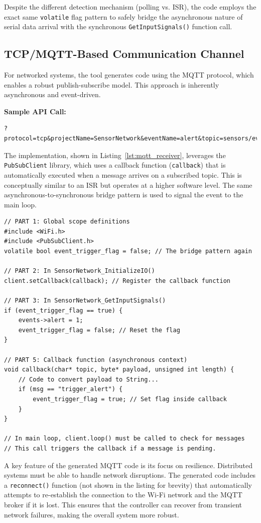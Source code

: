 Despite the different detection mechanism (polling vs. ISR), the code employs the exact same \texttt{volatile} flag pattern to safely bridge the asynchronous nature of serial data arrival with the synchronous \texttt{GetInputSignals()} function call.

\subsection{TCP/MQTT-Based Communication Channel}
For networked systems, the tool generates code using the MQTT protocol, which enables a robust publish-subscribe model. This approach is inherently asynchronous and event-driven.

\noindent\textbf{Sample API Call:}
\begin{verbatim}
?protocol=tcp&projectName=SensorNetwork&eventName=alert&topic=sensors/events
\end{verbatim}

The implementation, shown in Listing~\ref{lst:mqtt_receiver}, leverages the \texttt{PubSubClient} library, which uses a callback function (\texttt{callback}) that is automatically executed when a message arrives on a subscribed topic. This is conceptually similar to an ISR but operates at a higher software level. The same asynchronous-to-synchronous bridge pattern is used to signal the event to the main loop.

\begin{verbatim}
// PART 1: Global scope definitions
#include <WiFi.h>
#include <PubSubClient.h>
volatile bool event_trigger_flag = false; // The bridge pattern again

// PART 2: In SensorNetwork_InitializeIO()
client.setCallback(callback); // Register the callback function

// PART 3: In SensorNetwork_GetInputSignals()
if (event_trigger_flag == true) {
    events->alert = 1;
    event_trigger_flag = false; // Reset the flag
}

// PART 5: Callback function (asynchronous context)
void callback(char* topic, byte* payload, unsigned int length) {
    // Code to convert payload to String...
    if (msg == "trigger_alert") {
        event_trigger_flag = true; // Set flag inside callback
    }
}

// In main loop, client.loop() must be called to check for messages
// This call triggers the callback if a message is pending.
\end{verbatim}

A key feature of the generated MQTT code is its focus on resilience. Distributed systems must be able to handle network disruptions. The generated code includes a \texttt{reconnect()} function (not shown in the listing for brevity) that automatically attempts to re-establish the connection to the Wi-Fi network and the MQTT broker if it is lost. This ensures that the controller can recover from transient network failures, making the overall system more robust.

